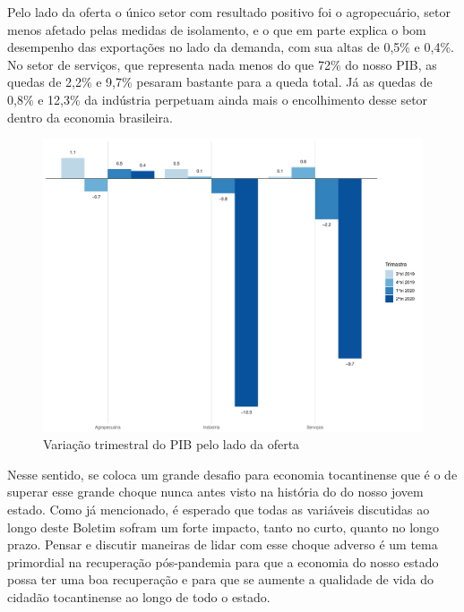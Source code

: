 \par Pelo lado da oferta o único setor com resultado positivo foi o agropecuário, setor menos afetado pelas medidas de isolamento, e o que em parte explica o bom desempenho das exportações no lado da demanda, com sua altas de 0,5\% e 0,4\%. No setor de serviços, que representa nada menos do que 72\% do nosso PIB, as quedas de 2,2\% e 9,7\% pesaram bastante para a queda total. Já as quedas de 0,8\% e 12,3\% da indústria perpetuam ainda mais o encolhimento desse setor dentro da economia brasileira.
\begin{figure}[ht]
	\caption{Variação trimestral do PIB pelo lado da oferta}
	\includegraphics[width=\linewidth]{fig/pib_oferta.pdf}
\end{figure}
\par Nesse sentido, se coloca um grande desafio para economia tocantinense que é o de superar esse grande choque nunca antes visto na história do do nosso jovem estado. Como já mencionado, é esperado que todas as variáveis discutidas ao longo deste Boletim sofram um forte impacto, tanto no curto, quanto no longo prazo. Pensar e discutir maneiras de lidar com esse choque adverso é um tema primordial na recuperação pós-pandemia para que a economia do nosso estado possa ter uma boa recuperação e para que se aumente a qualidade de vida do cidadão tocantinense ao longo de todo o estado. 
